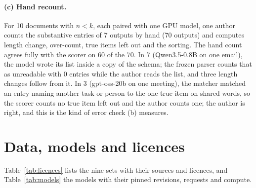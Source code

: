 \paragraph{(c) Hand recount.}
For 10 documents with $n < k$, each paired with one GPU model, one author counts the substantive entries of 7 outputs by hand (70 outputs) and computes length change, over-count, true items left out and the sorting.
The hand count agrees fully with the scorer on 60 of the 70.
In 7 (Qwen3.5-0.8B on one email), the model wrote its list inside a copy of the schema; the frozen parser counts that as unreadable with 0 entries while the author reads the list, and three length changes follow from it.
In 3 (gpt-oss-20b on one meeting), the matcher matched an entry naming another task or person to the one true item on shared words, so the scorer counts no true item left out and the author counts one; the author is right, and this is the kind of error check (b) measures.

\section{Data, models and licences}
\label{app:data}

Table~\ref{tab:licences} lists the nine sets with their sources and licences, and Table~\ref{tab:models} the models with their pinned revisions, requests and compute.

